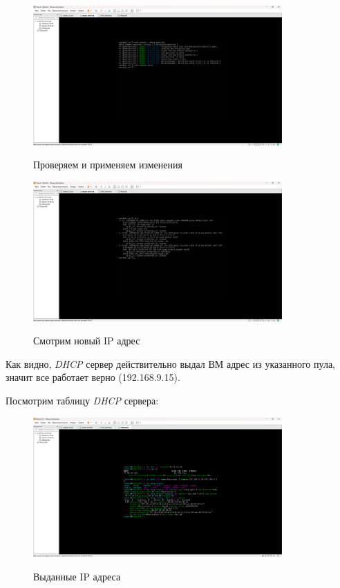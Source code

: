 \documentclass[a4paper]{article}
\begin{document}
  \begin{figure}[H]
    \centering
    \includegraphics[width=0.85\textwidth]{06_00 (105)}
    \label{img:105}
    \caption{Проверяем и применяем изменения}
  \end{figure}
  
  \begin{figure}[H]
    \centering
    \includegraphics[width=0.85\textwidth]{06_00 (106)}
    \label{img:106}
    \caption{Смотрим новый IP адрес}
  \end{figure}

  Как видно, \textit{DHCP} сервер действительно выдал ВМ адрес из указанного пула,
  значит все работает верно (192.168.9.15).
  
  Посмотрим таблицу \textit{DHCP} сервера:

  \begin{figure}[H]
    \centering
    \includegraphics[width=0.85\textwidth]{06_00 (107)}
    \label{img:107}
    \caption{Выданные IP адреса}
  \end{figure}
  
\end{document}
